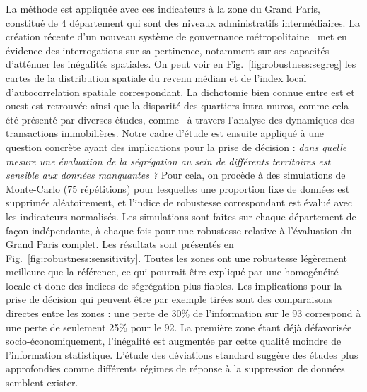 {La méthode est appliquée avec ces indicateurs à la zone du Grand Paris, constitué de 4 département qui sont des niveaux administratifs intermédiaires. La création récente d'un nouveau système de gouvernance métropolitaine~\cite{gilli2009paris} met en évidence des interrogations sur sa pertinence, notamment sur ses capacités d'atténuer les inégalités spatiales. On peut voir en Fig.~\ref{fig:robustness:segreg} les cartes de la distribution spatiale du revenu médian et de l'index local d'autocorrelation spatiale correspondant. La dichotomie bien connue entre est et ouest est retrouvée ainsi que la disparité des quartiers intra-muros, comme cela été présenté par diverses études, comme~\cite{guerois2009dynamique} à travers l'analyse des dynamiques des transactions immobilières. Notre cadre d'étude est ensuite appliqué à une question concrète ayant des implications pour la prise de décision : \textit{dans quelle mesure une évaluation de la ségrégation au sein de différents territoires est sensible aux données manquantes ?} Pour cela, on procède à des simulations de Monte-Carlo (75 répétitions) pour lesquelles une proportion fixe de données est supprimée aléatoirement, et l'indice de robustesse correspondant est évalué avec les indicateurs normalisés. Les simulations sont faites sur chaque département de façon indépendante, à chaque fois pour une robustesse relative à l'évaluation du Grand Paris complet. Les résultats sont présentés en Fig.~\ref{fig:robustness:sensitivity}. Toutes les zones ont une robustesse légèrement meilleure que la référence, ce qui pourrait être expliqué par une homogénéité locale et donc des indices de ségrégation plus fiables. Les implications pour la prise de décision qui peuvent être par exemple tirées sont des comparaisons directes entre les zones : une perte de 30\% de l'information sur le 93 correspond à une perte de seulement 25\% pour le 92. La première zone étant déjà défavorisée socio-économiquement, l'inégalité est augmentée par cette qualité moindre de l'information statistique. L'étude des déviations standard suggère des études plus approfondies comme différents régimes de réponse à la suppression de données semblent exister.
}



